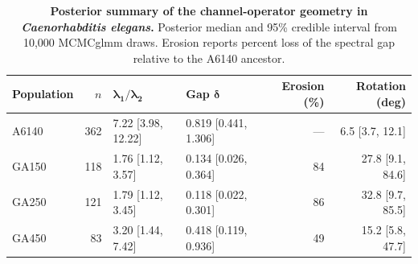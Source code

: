 \begin{table}[ht]
\centering
\small
\begin{tabular}{lrllrr}
\toprule
\textbf{Population} & $n$ & $\boldsymbol{\lambda_1/\lambda_2}$ & \textbf{Gap $\boldsymbol{\delta}$} & \textbf{Erosion (\%)} & \textbf{Rotation (deg)} \\
\midrule
A6140 & 362 & 7.22 [3.98, 12.22] & 0.819 [0.441, 1.306] & --- & 6.5 [3.7, 12.1] \\
GA150 & 118 & 1.76 [1.12, 3.57] & 0.134 [0.026, 0.364] & 84 & 27.8 [9.1, 84.6] \\
GA250 & 121 & 1.79 [1.12, 3.45] & 0.118 [0.022, 0.301] & 86 & 32.8 [9.7, 85.5] \\
GA450 & 83 & 3.20 [1.44, 7.42] & 0.418 [0.119, 0.936] & 49 & 15.2 [5.8, 47.7] \\
\bottomrule
\end{tabular}
\caption{\textbf{Posterior summary of the channel-operator geometry in
\textit{Caenorhabditis elegans}.} Posterior median and 95\% credible
interval from 10,000 MCMCglmm draws. Erosion reports percent loss of
the spectral gap relative to the A6140 ancestor.}
\label{tab:celegans_summary}
\end{table}
